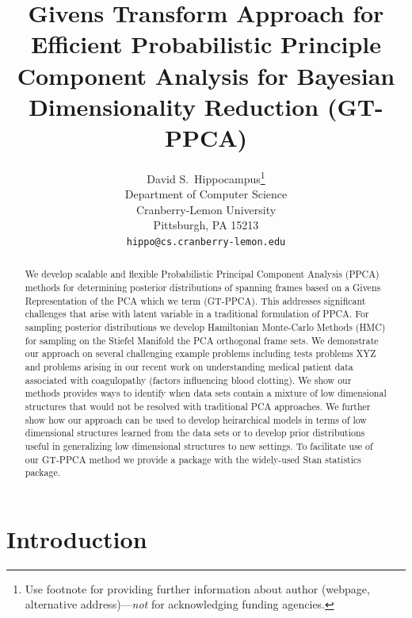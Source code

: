 \documentclass{article}
\title{Givens Transform Approach for Efficient Probabilistic Principle Component Analysis for Bayesian Dimensionality Reduction (GT-PPCA)}
\author{
  David S.~Hippocampus\thanks{Use footnote for providing further
    information about author (webpage, alternative
    address)---\emph{not} for acknowledging funding agencies.} \\
  Department of Computer Science\\
  Cranberry-Lemon University\\
  Pittsburgh, PA 15213 \\
  \texttt{hippo@cs.cranberry-lemon.edu} \\
}
\begin{document}

\maketitle

\begin{abstract}
We develop scalable and flexible Probabilistic Principal Component Analysis (PPCA) methods for determining posterior distributions of spanning frames based on a Givens Representation of the PCA which we term (GT-PPCA).  This addresses significant challenges that arise with latent variable in a traditional formulation of PPCA.  For sampling posterior distributions we develop Hamiltonian Monte-Carlo Methods (HMC) for sampling on the Stiefel Manifold the PCA orthogonal frame sets.  We demonstrate our approach on several challenging example problems including tests problems XYZ and problems arising in  our recent work on understanding medical patient data associated with coagulopathy (factors influencing blood clotting).  We show our methods provides ways to identify when data sets contain a mixture of low dimensional structures that would not be resolved with traditional PCA approaches.  We further show how our approach can be used to develop heirarchical models in terms of low dimensional structures learned from the data sets or to develop prior distributions useful in generalizing low dimensional structures to new settings.  To facilitate use of our GT-PPCA method we provide a package with the widely-used Stan statistics package.  
\end{abstract}

\section{Introduction}

\end{document}

